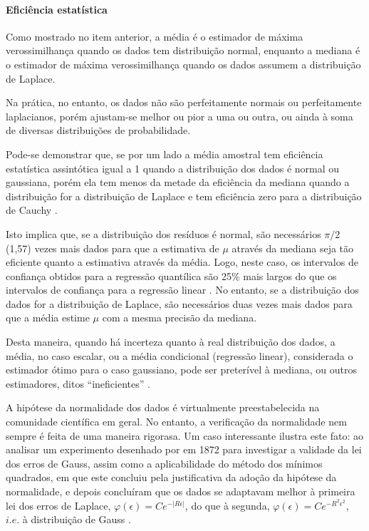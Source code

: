 \documentclass[a4paper, 12pt]{article}
\let\oldparagraph\paragraph
\renewcommand{\paragraph}[1]{\oldparagraph{#1}\mbox{}}
\begin{document}
\hypertarget{eficiencia-estatistica}{%
\paragraph{Eficiência estatística}\label{eficiencia-estatistica}}

Como mostrado no item anterior, a média é o estimador de máxima
verossimilhança quando os dados tem distribuição normal, enquanto a
mediana é o estimador de máxima verossimilhança quando os dados assumem
a distribuição de Laplace.

Na prática, no entanto, os dados não são perfeitamente normais ou
perfeitamente laplacianos, porém ajustam-se melhor ou pior a uma ou
outra, ou ainda à soma de diversas distribuições de probabilidade.

Pode-se demonstrar que, se por um lado a média amostral tem eficiência
estatística assintótica igual a 1 quando a distribuição dos dados é
normal ou gaussiana, porém ela tem menos da metade da eficiência da
mediana quando a distribuição for a distribuição de Laplace e tem
eficiência zero para a distribuição de Cauchy
\autocite[p.36]{koenker1978}.

Isto implica que, se a distribuição dos resíduos é normal, são
necessários \(\pi/2\) (1,57) vezes mais dados para que a estimativa de
\(\mu\) através da mediana seja tão eficiente quanto a estimativa
através da média. Logo, neste caso, os intervalos de confiança obtidos
para a regressão quantílica são 25\% mais largos do que os intervalos de
confiança para a regressão linear
\autocites[354]{koenker2000}[92]{dasGupta}. No entanto, se a
distribuição dos dados for a distribuição de Laplace, são necessários
duas vezes mais dados para que a média estime \(\mu\) com a mesma
precisão da mediana.

Desta maneira, quando há incerteza quanto à real distribuição dos dados,
a média, no caso escalar, ou a média condicional (regressão linear),
considerada o estimador ótimo para o caso gaussiano, pode ser preterível
à mediana, ou outros estimadores, ditos ``ineficientes''
\autocite[p.36]{koenker1978}.

A hipótese da normalidade dos dados é virtualmente preestabelecida na
comunidade científica em geral. No entanto, a verificação da normalidade
nem sempre é feita de uma maneira rigorasa. Um caso interessante ilustra
este fato: ao analisar um experimento desenhado por \textcite{pierce} em
1872 para investigar a validade da lei dos erros de Gauss, assim como a
aplicabilidade do método dos mínimos quadrados, em que este concluiu
pela justificativa da adoção da hipótese da normalidade,
\textcite{frechet} e depois \textcite{wilson} concluíram que os dados se
adaptavam melhor à primeira lei dos erros de Laplace,
\(\varphi (\epsilon) = Ce^{-|R\epsilon|}\), do que à segunda,
\(\varphi (\epsilon) = Ce^{-R^2\epsilon^2}\), \(i.e.\) à distribuição de
Gauss \autocite[62]{mim}.
\end{document}

